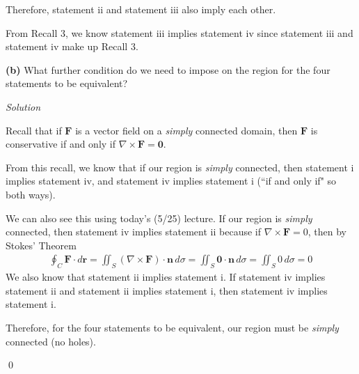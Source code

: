 \documentclass{article}
\newcommand{\lrp}[1]{\left( #1 \right)}
\renewcommand{\r}[0]{\mathbf{r}}
\newcommand{\F}[0]{\mathbf{F}}
\newcommand{\n}[0]{\mathbf{n}}
\newcommand{\Solution}{\textit{Solution}}
\begin{document}
Therefore, statement ii and statement iii also imply each other.



From Recall 3, we know statement iii implies statement iv since statement iii and statement iv make up Recall 3.

{}\textbf{(b)} What further condition do we need to impose on the region for the four statements to be equivalent?

\Solution

Recall that if $\F$ is a vector field on a \textit{simply} connected domain, then $\F$ is conservative if and only if $\nabla \times \F = \mathbf{0}$.

From this recall, we know that if our region is \textit{simply} connected, then statement i implies statement iv, and statement iv implies statement i (``if and only if" so both ways).


We can also see this using today's (5/25) lecture. 
If our region is \textit{simply} connected, then statement iv implies statement ii because if $\nabla \times \F = 0$, then by Stokes' Theorem
\begin{align*}
     \oint_C \F\cdot d\r = \iint_S \lrp{\nabla \times \F}\cdot \n\,d\sigma=\iint_S \mathbf{0}\cdot \n \,d\sigma = \iint_S 0\,d\sigma = 0
\end{align*}
We also know that statement ii implies statement i. If statement iv implies statement ii and statement ii implies statement i, then statement iv implies statement i.

Therefore, for the four statements to be equivalent, our region must be \textit{simply} connected (no holes).

\qed
\end{document}
